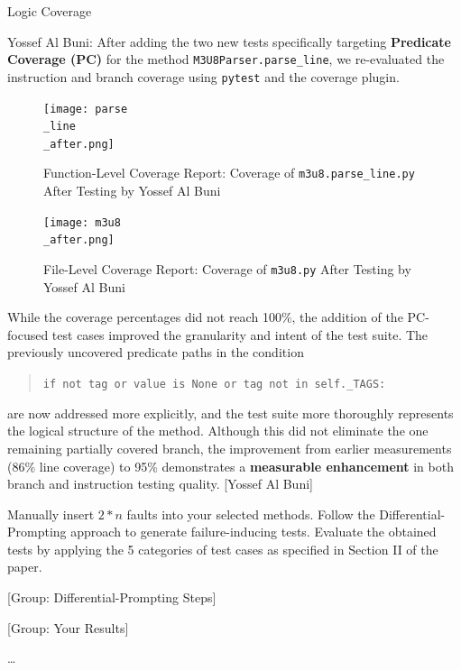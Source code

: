 \documentclass[a4paper]{scrreprt}
\newcounter{question}
\begin{document}
\begin{question}{Logic Coverage}
\begin{enumerate}[topsep=0pt, leftmargin=*]
\begin{answer}
Yossef Al Buni: 
After adding the two new tests specifically targeting \textbf{Predicate Coverage (PC)} for the method \texttt{M3U8Parser.parse\_line}, we re-evaluated the instruction and branch coverage using \texttt{pytest} and the coverage plugin.
\begin{figure}[H]
\centering
\texttt{[image: parse\\\_line\\\_after.png]}
\caption{Function-Level Coverage Report: Coverage of \texttt{m3u8.parse\_line.py} After Testing by Yossef Al Buni}
\end{figure}
\begin{figure}[H]
\centering
\texttt{[image: m3u8\\\_after.png]}
\caption{File-Level Coverage Report: Coverage of \texttt{m3u8.py} After Testing by Yossef Al Buni}
\end{figure}
While the coverage percentages did not reach 100\%, the addition of the PC-focused test cases improved the granularity and intent of the test suite. The previously uncovered predicate paths in the condition
\begin{quote}
\texttt{if not tag or value is None or tag not in self.\_TAGS:}
\end{quote}
are now addressed more explicitly, and the test suite more thoroughly represents the logical structure of the method.
Although this did not eliminate the one remaining partially covered branch, the improvement from earlier measurements (86\% line coverage) to 95\% demonstrates a \textbf{measurable enhancement} in both branch and instruction testing quality. [Yossef Al Buni]


          \end{answer}
  \end{enumerate}
\end{question}

\begin{aiTask}
  Manually insert $2 * n$ faults into your selected methods. Follow the Differential-Prompting approach to generate failure-inducing tests. Evaluate the obtained tests by applying the 5 categories of test cases as specified in Section II of the paper.
  \begin{answer}

    [Group: Differential-Prompting Steps]

    [Group: Your Results]

    \dots
  \end{answer}
\end{aiTask}
\end{document}
